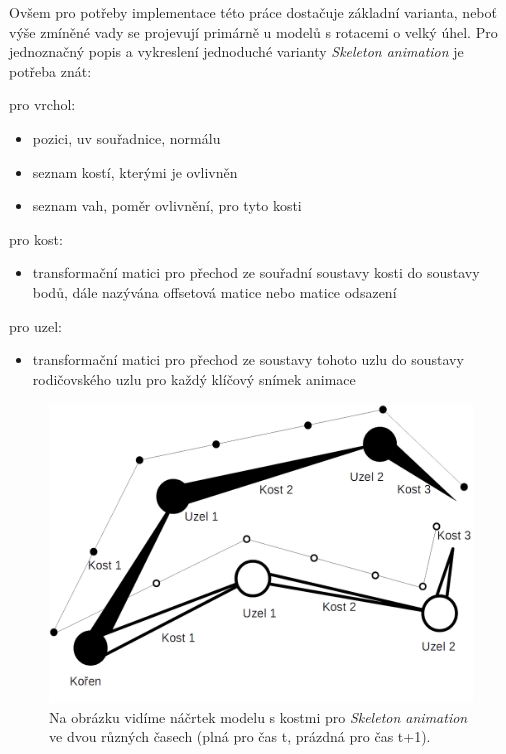 Ovšem pro potřeby implementace této práce dostačuje základní varianta, neboť výše zmíněné vady se projevují primárně u modelů s rotacemi o velký úhel. Pro jednoznačný popis a vykreslení jednoduché varianty \emph{Skeleton animation} je potřeba znát:
\begin{itemize}
	\begin{item}
		pro vrchol:
			\begin{itemize}			
			\item pozici, uv souřadnice, normálu
			\item seznam kostí, kterými je ovlivněn
			\item seznam vah, poměr ovlivnění, pro tyto kosti
		\end{itemize}
	\end{item}
	\begin{item}
	pro kost:
	\begin{itemize}
		\item transformační matici pro přechod ze souřadní soustavy kosti do soustavy bodů, dále nazývána offsetová matice nebo matice odsazení 
	\end{itemize}

\end{item}
	\begin{item}
	pro uzel:
	\begin{itemize}
		\item transformační matici pro přechod ze soustavy tohoto uzlu do soustavy rodičovského uzlu pro každý klíčový snímek animace
	\end{itemize}
	
\end{item}
	
\end{itemize}  
\begin{figure}
\begin{center}

\includegraphics[scale=0.33 ]{obrazky-figures/skeletalAnimation}
\caption{Na obrázku vidíme náčrtek modelu s kostmi pro \emph{Skeleton animation} ve dvou různých časech (plná pro čas t, prázdná pro čas t+1).}\label{skeletalAnimation}
\end{center}\end{figure}
